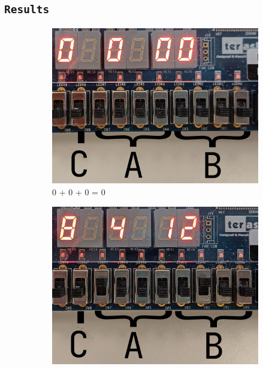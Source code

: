 \documentclass{article}
\let\oldsubsection\subsection
\renewcommand{\subsection}[1]{%
  \oldsubsection{\texttt{#1}}%
  \setcounter{subsubsection}{-1}%
}
\begin{document}
\clearpage
\subsection{Results}
\begin{figure}[h]
    \centering
    \begin{subfigure}{0.4\textwidth}
        \centering
        \includegraphics[width=1\textwidth]{Figures/Part5-0_0_0.jpg}
        \caption{0 + 0 + 0 = 0}
        \label{fig:T05pic1}
    \end{subfigure}
    \hfill
    \begin{subfigure}{0.4\textwidth}
        \centering
        \includegraphics[width=1\textwidth]{Figures/Part5-0_8_4.jpg}

\end{subfigure}
\end{figure}
\end{document}
